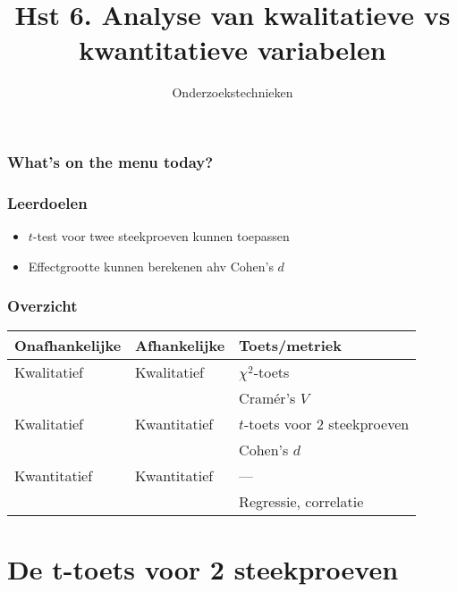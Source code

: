 \documentclass[aspectratio=169]{beamer}
\title{Hst 6. Analyse van kwalitatieve vs kwantitatieve variabelen}
\subtitle{Onderzoekstechnieken}
\begin{document}
\begin{frame}
  \maketitle
\end{frame}

\begin{frame}
  \frametitle{What's on the menu today?}
  
  \tableofcontents
\end{frame}

\begin{frame}
  \frametitle{Leerdoelen}
  
  \begin{itemize}
    \item $t$-test voor twee steekproeven kunnen toepassen
    \item Effectgrootte kunnen berekenen ahv Cohen's $d$
  \end{itemize}
\end{frame}

\begin{frame}
  \frametitle{Overzicht}
  \centering
  \begin{tabular}{lll}
    \toprule
    \textbf{Onafhankelijke} & \textbf{Afhankelijke} & \textbf{Toets/metriek}        \\
    \midrule
    Kwalitatief             & Kwalitatief           & $\chi^2$-toets                \\
    &                       & Cramér's $V$                  \\
    Kwalitatief             & Kwantitatief          & $t$-toets voor 2 steekproeven \\
    &                       & Cohen's $d$                   \\
    Kwantitatief            & Kwantitatief          & ---                           \\
    &                       & Regressie, correlatie         \\
    \bottomrule
  \end{tabular}
\end{frame}

\section{De t-toets voor 2 steekproeven}
\end{document}
